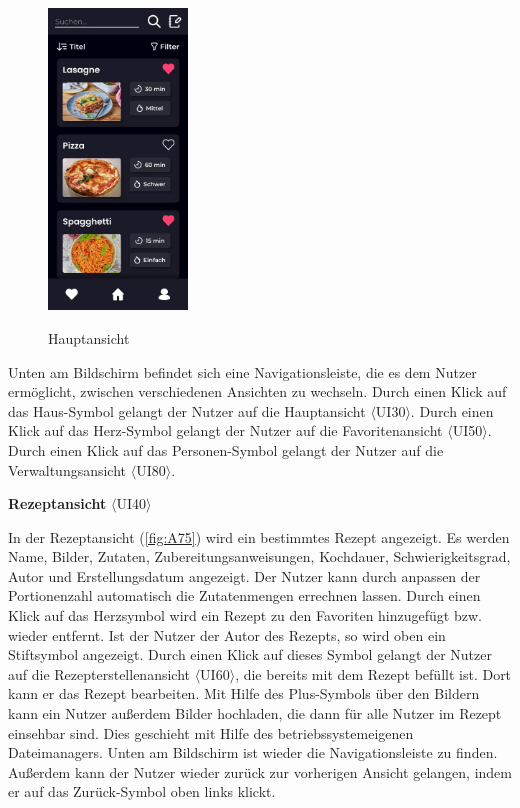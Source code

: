 \documentclass[parskip=full]{scrartcl}
\begin{document}
\begin{figure}[!htp]
    \centering
    \includegraphics[height=80mm]{images/section7/MainView.jpg}
    \label{fig:A74}
    \caption{Hauptansicht}
\end{figure}

Unten am Bildschirm befindet sich eine Navigationsleiste, die es dem Nutzer ermöglicht, zwischen verschiedenen Ansichten zu wechseln. Durch einen Klick auf das Haus-Symbol gelangt der Nutzer auf die Hauptansicht $\langle$UI30$\rangle$. Durch einen Klick auf das Herz-Symbol gelangt der Nutzer auf die Favoritenansicht $\langle$UI50$\rangle$. Durch einen Klick auf das Personen-Symbol gelangt der Nutzer auf die Verwaltungsansicht $\langle$UI80$\rangle$.

\textbf{Rezeptansicht} $\langle$UI40$\rangle$

In der Rezeptansicht (\ref{fig:A75}) wird ein bestimmtes Rezept angezeigt. Es werden Name, Bilder, Zutaten, Zubereitungsanweisungen, Kochdauer, Schwierigkeitsgrad, Autor und Erstellungsdatum angezeigt. Der Nutzer kann durch anpassen der Portionenzahl automatisch die Zutatenmengen errechnen lassen. Durch einen Klick auf das Herzsymbol wird ein Rezept zu den Favoriten hinzugefügt bzw. wieder entfernt. Ist der Nutzer der Autor des Rezepts, so wird oben ein Stiftsymbol angezeigt. Durch einen Klick auf dieses Symbol gelangt der Nutzer auf die Rezepterstellenansicht $\langle$UI60$\rangle$, die bereits mit dem Rezept befüllt ist. Dort kann er das Rezept bearbeiten. Mit Hilfe des Plus-Symbols über den Bildern kann ein Nutzer außerdem Bilder hochladen, die dann für alle Nutzer im Rezept einsehbar sind. Dies geschieht mit Hilfe des betriebssystemeigenen Dateimanagers. Unten am Bildschirm ist wieder die Navigationsleiste zu finden. Außerdem kann der Nutzer wieder zurück zur vorherigen Ansicht gelangen, indem er auf das Zurück-Symbol oben links klickt.
\end{document}
